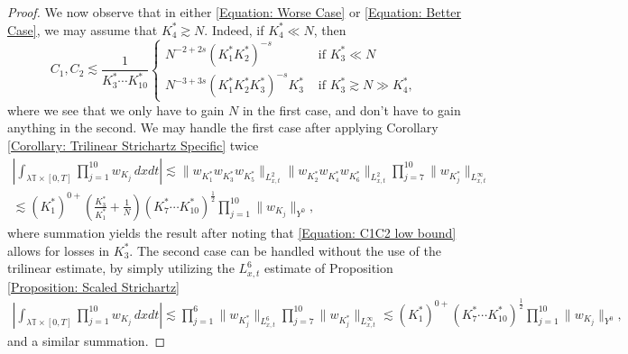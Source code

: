 \documentclass[12pt, letterpaper]{amsart}
\begin{document}
\begin{proof}
    We now observe that in either \eqref{Equation: Worse Case} or \eqref{Equation: Better Case}, we may assume that $K_4^*\gtrsim N$. Indeed, if $K_4^*\ll N$, then 
    \begin{equation}\label{Equation: C1C2 low bound}
        C_1,C_2\lesssim \frac{1}{K_3^*\cdots K_{10}^*}
            \begin{cases}
            N^{-2+2s}(K_1^*K_2^*)^{-s} & \mbox{ if }K_3^*\ll N\\
            N^{-3+3s}(K_1^*K_2^*K_3^*)^{-s}K_3^* & \mbox{ if }K_3^*\gtrsim N\gg K_4^*,
            \end{cases}
    \end{equation}
    where we see that we only have to gain $N$ in the first case, and don't have to gain anything in the second. We may handle the first case after applying Corollary \ref{Corollary: Trilinear Strichartz Specific} twice
    \begin{multline*}
        \left|\int_{\lambda\mathbb{T}\times [0,T]}\prod_{j=1}^{10}w_{K_j}\,dxdt\right|\lesssim \|w_{K_1^*}w_{K_3^*}w_{K_5^*}\|_{L^2_{x,t}}\|w_{K_2^*}w_{K_4^*}w_{K_6^*}\|_{L^2_{x,t}}\prod_{j=7}^{10}\|w_{K_j^*}\|_{L^\infty_{x,t}}\\
        \lesssim (K_1^*)^{0+}\left(\frac{K_3^*}{K_1^*} + \frac{1}{N}\right)(K_7^*\cdots K_{10}^*)^{\frac12}\prod_{j=1}^{10}\|w_{K_j}\|_{Y^0},
    \end{multline*}
    where summation yields the result after noting that \eqref{Equation: C1C2 low bound} allows for losses in $K_3^*$. The second case can be handled without the use of the trilinear estimate, by simply utilizing the $L^6_{x,t}$ estimate of Proposition \ref{Proposition: Scaled Strichartz}
    \begin{multline*}
        \left|\int_{\lambda\mathbb{T}\times [0,T]}\prod_{j=1}^{10}w_{K_j}\,dxdt\right|
        \lesssim \prod_{j=1}^6 \|w_{K_j^*}\|_{L^6_{x,t}}\prod_{j=7}^{10}\|w_{K_j^*}\|_{L^\infty_{x,t}}
        \lesssim (K_1^*)^{0+}(K_7^*\cdots K_{10}^*)^{\frac12}\prod_{j=1}^{10}\|w_{K_j}\|_{Y^0},
    \end{multline*}
    and a similar summation.


\end{proof}
\end{document}
